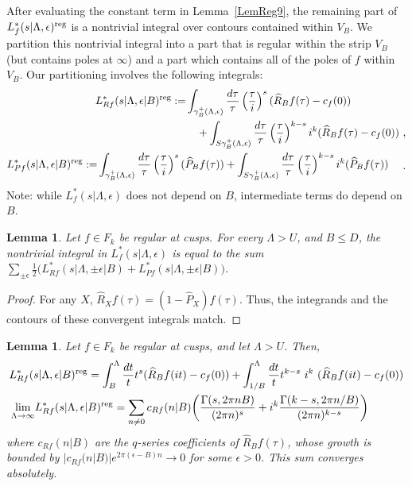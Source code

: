 \documentclass[11pt,a4paper]{article}
\newcommand{\g}{\gamma}
\newcommand{\e}{\epsilon}
\newcommand{\G}{\Gamma}
\newcommand{\La}{\Lambda}
\newtheorem{lem}[thm]{Lemma}
\newcommand{\reg}{{\rm reg}}
\newcommand{\PF}{\widehat{P}} 				%
\newcommand{\RF}{\widehat{R}} 				%
\begin{document}
After evaluating the constant term in Lemma~\ref{LemReg9}, the remaining part of $L_f^*(s|\La,\e)^\reg$ is a nontrivial integral over contours contained within $V_B$. We partition this nontrivial integral into a part that is regular within the strip $V_B$ (but contains poles at $\infty$) and a part which contains all of the poles of $f$ within $V_B$. Our partitioning involves the following integrals:
\begin{align}
\begin{split}
L_{Rf}^*(s|\La,\e|B)^\reg:= &
\int_{\g_B^+(\La,\e)} \frac{d\tau}{\tau}\left(\frac{\tau}{i}\right)^s (\RF_B f(\tau) - c_f(0)) \\
&\quad +
\int_{S\g_B^+(\La,\e)} \frac{d\tau}{\tau}\left(\frac{\tau}{i}\right)^{k-s}  i^k  (\RF_B f(\tau) - c_f(0)) ~,
\end{split}\label{eqLemRegXa}\\
\begin{split}
L_{Pf}^*(s|\La,\e|B)^\reg:= &
\int_{\g_B^+(\La,\e)} \frac{d\tau}{\tau}\left(\frac{\tau}{i}\right)^s (\PF_B f(\tau)) +
\int_{S\g_B^+(\La,\e)} \frac{d\tau}{\tau}\left(\frac{\tau}{i}\right)^{k-s}  i^k  (\PF_B f(\tau)) 
\end{split}
\label{eqLemRegXb}~.
\end{align}
Note: while $L_f^*(s|\La,\e)$ does not depend on $B$, intermediate terms do depend on $B$.

\begin{lem}
\label{LemRegX}
Let $f \in F_k$ be regular at cusps. For every $\La >U$, and $B \leq D$, the nontrivial integral in $L_f^*(s|\La,\e)$ is equal to the sum $\sum_{\pm \e} \tfrac12 \big(L_{Rf}^*(s|\La,\pm\e|B) + L_{Pf}^*(s|\La,\pm\e|B) \big)$.
\end{lem}

\begin{proof}
For any $X$, $\RF_X f(\tau) = (1-\PF_X) f(\tau)$. Thus, the integrands and the contours of these convergent integrals match. 
\end{proof}

\begin{lem}\label{LemRegX1}
Let $f \in F_k$ be regular at cusps, and let $\La > U$. Then,
\begin{align}
&L_{Rf}^*(s|\La,\e|B)^\reg = \int_{B}^{\La} \frac{dt}{t} t^{s} (\RF_B f(i t)-c_f(0)) + \int_{1/B}^{\La} \frac{dt}{t} t^{k-s}~i^k~  (\RF_B f(i t)-c_f(0)) 
\label{eqLemRegX1a}
\\
&\lim_{\La \to \infty}\! L_{Rf}^*(s|\La,\e|B)^{\reg} = \sum_{n \neq 0} c_{Rf}(n|B) \bigg( \frac{\G(s,2\pi n B)}{(2\pi n)^s}  + i^k \frac{\G(k-s,2\pi n/B)}{(2\pi n)^{k-s}}  \bigg)
\label{eqLemRegX1b}
\end{align}
where $c_{Rf}(n|B)$ are the $q$-series coefficients of $\RF_B f(\tau)$, whose growth is bounded by $|c_{Rf}(n|B)|e^{2\pi (\e-B)n} \to 0$ for some $\e >0$. This sum converges absolutely.
\end{lem}
\end{document}
